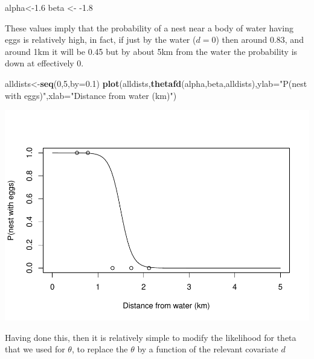 \documentclass[
]{book}
\newenvironment{Shaded}{\begin{snugshade}}{\end{snugshade}}
\newcommand{\DataTypeTok}[1]{\textcolor[rgb]{0.13,0.29,0.53}{#1}}
\newcommand{\DecValTok}[1]{\textcolor[rgb]{0.00,0.00,0.81}{#1}}
\newcommand{\FloatTok}[1]{\textcolor[rgb]{0.00,0.00,0.81}{#1}}
\newcommand{\KeywordTok}[1]{\textcolor[rgb]{0.13,0.29,0.53}{\textbf{#1}}}
\newcommand{\NormalTok}[1]{#1}
\newcommand{\StringTok}[1]{\textcolor[rgb]{0.31,0.60,0.02}{#1}}
\begin{document}
\begin{Shaded}
\begin{Highlighting}[]
\NormalTok{alpha<-}\FloatTok{1.6}
\NormalTok{beta <-}\StringTok{ }\FloatTok{-1.8}
\end{Highlighting}
\end{Shaded}

These values imply that the probability of a nest near a body of water having eggs is relatively high, in fact, if just by the water (\(d=0\)) then around 0.83, and around 1km it will be 0.45 but by about 5km from the water the probability is down at effectively 0.

\begin{Shaded}
\begin{Highlighting}[]
\NormalTok{alldists<-}\KeywordTok{seq}\NormalTok{(}\DecValTok{0}\NormalTok{,}\DecValTok{5}\NormalTok{,}\DataTypeTok{by=}\FloatTok{0.1}\NormalTok{)}
\KeywordTok{plot}\NormalTok{(alldists,}\KeywordTok{thetafd}\NormalTok{(alpha,beta,alldists),}\DataTypeTok{ylab=}\StringTok{"P(nest with eggs)"}\NormalTok{,}\DataTypeTok{xlab=}\StringTok{"Distance from water (km)"}\NormalTok{)}
\end{Highlighting}
\end{Shaded}

\includegraphics{ECOMODbook_files/figure-latex/ch13.33-1.pdf}

Having done this, then it is relatively simple to modify the likelihood for theta that we used for \(\theta\), to replace the \(\theta\) by a function of the relevant covariate \(d\)
\end{document}
